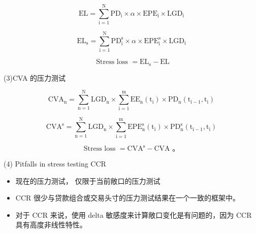     \[
    \mathrm{{EL}} = \mathop{\sum }\limits_{{\mathrm{i} = 1}}^{\mathrm{N}}{\mathrm{{PD}}}_{\mathrm{i}} \times  \alpha  \times  {\mathrm{{EPE}}}_{\mathrm{i}} \times  {\mathrm{{LGD}}}_{\mathrm{i}}
    \]
    
    \[
    {\mathrm{{EL}}}_{\mathrm{s}} = \mathop{\sum }\limits_{{\mathrm{i} = 1}}^{\mathrm{N}}{\mathrm{{PD}}}_{\mathrm{i}}^{\mathrm{s}} \times  \alpha  \times  {\mathrm{{EPE}}}_{\mathrm{i}}^{\mathrm{s}} \times  {\mathrm{{LGD}}}_{\mathrm{i}}
    \]
    
    \[
    \text{ Stress loss } = {\mathrm{{EL}}}_{\mathrm{s}} - \mathrm{{EL}}
    \]
    
    (3)CVA 的压力测试
    
    \[
    {\mathrm{{CVA}}}_{\mathrm{n}} = \mathop{\sum }\limits_{{\mathrm{n} = 1}}^{\mathrm{N}}{\mathrm{{LGD}}}_{\mathrm{n}} \times  \mathop{\sum }\limits_{{\mathrm{i} = 1}}^{\mathrm{m}}{\mathrm{{EE}}}_{\mathrm{n}}\left( {\mathrm{t}}_{\mathrm{i}}\right)  \times  {\mathrm{{PD}}}_{\mathrm{n}}\left( {{\mathrm{t}}_{\mathrm{i} - 1},{\mathrm{t}}_{\mathrm{i}}}\right)
    \]
    
    \[
    {\mathrm{{CVA}}}^{\mathrm{s}} = \mathop{\sum }\limits_{{\mathrm{n} = 1}}^{\mathrm{N}}{\mathrm{{LGD}}}_{\mathrm{n}} \times  \mathop{\sum }\limits_{{\mathrm{i} = 1}}^{\mathrm{m}}{\mathrm{{EPE}}}_{\mathrm{n}}^{\mathrm{s}}\left( {\mathrm{t}}_{\mathrm{i}}\right)  \times  {\mathrm{{PD}}}_{\mathrm{n}}^{\mathrm{s}}\left( {{\mathrm{t}}_{\mathrm{i} - 1},{\mathrm{t}}_{\mathrm{i}}}\right)
    \]
    
    \[
    \text{ Stress loss } = {\mathrm{{CVA}}}^{\mathrm{s}} - \mathrm{{CVA}}\text{ 。 }
    \]
    
    (4) Pitfalls in stress testing CCR
    
    \begin{itemize}
    \item 现在的压力测试， 仅限于当前敞口的压力测试
    \end{itemize}
    
    \begin{itemize}
    \item CCR 很少与贷款组合或交易头寸的压力测试结果在一个一致的框架中。
    \end{itemize}
    
    \begin{itemize}
    \item 对于 CCR 来说，使用 delta 敏感度来计算敞口变化是有问题的，因为 CCR 具有高度非线性特性。
    \end{itemize}